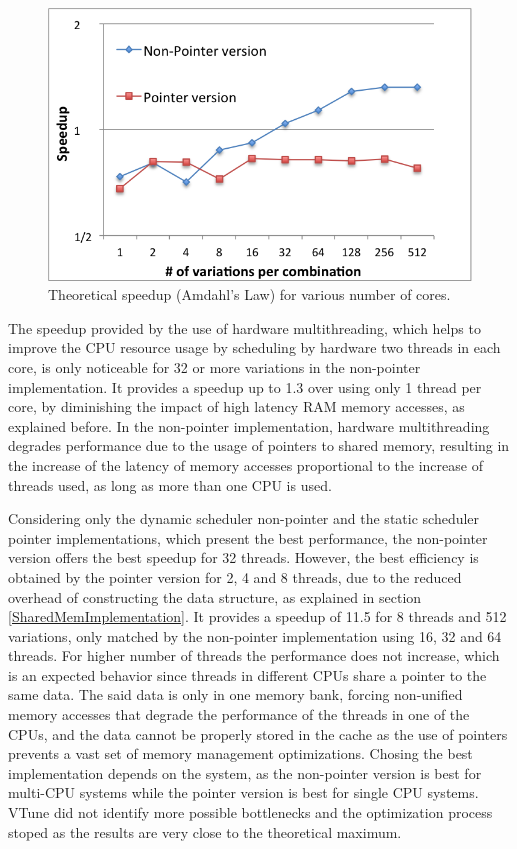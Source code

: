 \begin{figure}[!htp]
	\begin{center}
		\includegraphics[scale=0.7]{../../common/graphs/ht_speedup.png}
		\caption{Theoretical speedup (Amdahl's Law) for various number of cores.}
		\label{fig:AmdahlSpeedup}
	\end{center}
\end{figure}

The speedup provided by the use of hardware multithreading, which helps to improve the CPU resource usage by scheduling by hardware two threads in each core, is only noticeable for 32 or more variations in the non-pointer implementation. It provides a speedup up to 1.3 over using only 1 thread per core, by diminishing the impact of high latency RAM memory accesses, as explained before. In the non-pointer implementation, hardware multithreading degrades performance due to the usage of pointers to shared memory, resulting in the increase of the latency of memory accesses proportional to the increase of threads used, as long as more than one CPU is used.

Considering only the dynamic scheduler non-pointer and the static scheduler pointer implementations, which present the best performance, the non-pointer version offers the best speedup for 32 threads. However, the best efficiency is obtained by the pointer version for 2, 4 and 8 threads, due to the reduced overhead of constructing the data structure, as explained in section \ref{SharedMemImplementation}. It provides a speedup of 11.5 for 8 threads and 512 variations, only matched by the non-pointer implementation using 16, 32 and 64 threads. For higher number of threads the performance does not increase, which is an expected behavior since threads in different CPUs share a pointer to the same data. The said data is only in one memory bank, forcing non-unified memory accesses that degrade the performance of the threads in one of the CPUs, and the data cannot be properly stored in the cache as the use of pointers prevents a vast set of memory management optimizations. Chosing the best implementation depends on the system, as the non-pointer version is best for multi-CPU systems while the pointer version is best for single CPU systems. VTune did not identify more possible bottlenecks and the optimization process stoped as the results are very close to the theoretical maximum.

